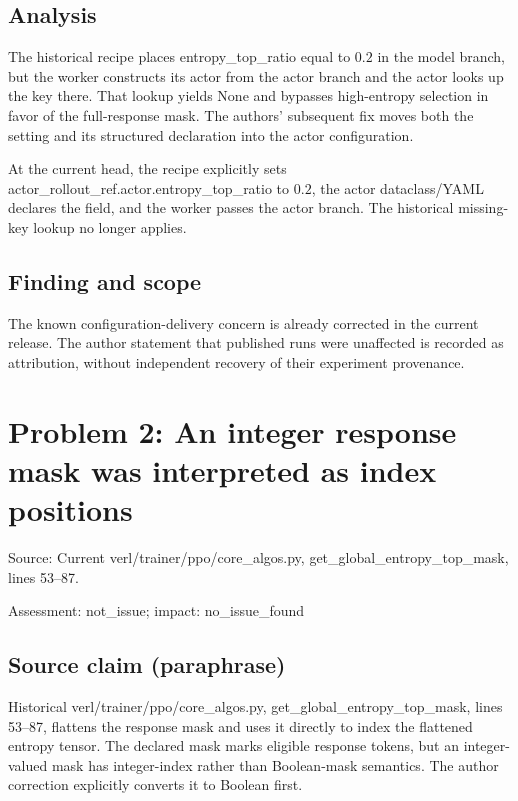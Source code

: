 \documentclass[11pt]{article}
\begin{document}
\subsection*{Analysis}

The historical recipe places entropy\_top\_ratio equal to \(0.2\) in the model branch, but the worker constructs its actor from the actor branch and the actor looks up the key there. That lookup yields None and bypasses high-entropy selection in favor of the full-response mask. The authors' subsequent fix moves both the setting and its structured declaration into the actor configuration.

At the current head, the recipe explicitly sets actor\_rollout\_ref.actor.entropy\_top\_ratio to \(0.2\), the actor dataclass/YAML declares the field, and the worker passes the actor branch. The historical missing-key lookup no longer applies.

\subsection*{Finding and scope}

The known configuration-delivery concern is already corrected in the current release. The author statement that published runs were unaffected is recorded as attribution, without independent recovery of their experiment provenance.

\section*{Problem 2: An integer response mask was interpreted as index positions}

Source: Current verl/trainer/ppo/core\_algos.py, get\_global\_entropy\_top\_mask, lines 53–87.

Assessment: not\_issue; impact: no\_issue\_found

\subsection*{Source claim (paraphrase)}

Historical verl/trainer/ppo/core\_algos.py, get\_global\_entropy\_top\_mask, lines 53–87, flattens the response mask and uses it directly to index the flattened entropy tensor. The declared mask marks eligible response tokens, but an integer-valued mask has integer-index rather than Boolean-mask semantics. The author correction explicitly converts it to Boolean first.
\end{document}
